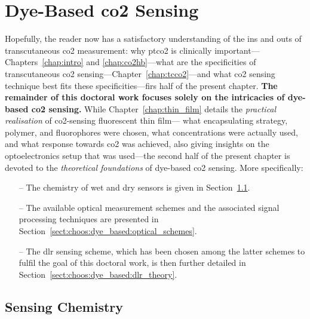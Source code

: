\section{Dye-Based \texorpdfstring{\gls{co2}}{CO2} Sensing}\label{sect:choos:dye_based}

Hopefully, the reader now has a satisfactory understanding of the ins and outs of transcutaneous \gls{co2} measurement: why \gls{ptco2} is clinically important---Chapters~\ref{chap:intro} and \ref{chap:co2hb}---what are the specificities of transcutaneous \gls{co2} sensing---Chapter~\ref{chap:tcco2}---and what \gls{co2} sensing technique best fits these specificities---firs half of the present chapter. \textbf{The remainder of this doctoral work focuses solely on the intricacies of dye-based \gls{co2} sensing.} While Chapter~\ref{chap:thin_film} details the \emph{practical realisation} of \gls{co2}-sensing fluorescent thin film---\ie{} what encapsulating strategy, polymer, and fluorophores were chosen, what concentrations were actually used, and what response towards \gls{co2} was achieved, also giving insights on the optoelectronics setup that was used---the second half of the present chapter is devoted to the \emph{theoretical foundations} of dye-based \gls{co2} sensing. More specifically:
\begin{itemize}
	\item[--] The chemistry of wet and dry sensors is given in Section~\ref{sect:choos:dye_based:chemistry}.
	\item[--] The available optical measurement schemes and the associated signal processing techniques are presented in Section~\ref{sect:choos:dye_based:optical_schemes}.
	\item[--] The \gls{dlr} sensing scheme, which has been chosen among the latter schemes to fulfil the goal of this doctoral work, is then further detailed in Section~\ref{sect:choos:dye_based:dlr_theory}.
\end{itemize}

\subsection{Sensing Chemistry}\label{sect:choos:dye_based:chemistry}

